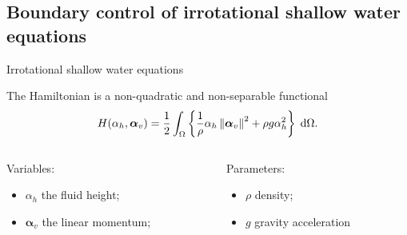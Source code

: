 \documentclass[aspectratio=169]{ISAE-Beamer}
\newcommand*{\norm}[1]{\ensuremath{\left\|#1\right\|}}
\newcommand{\energy}[1]{\frac{1}{2} \int_{\Omega} \left\{ #1 \right\} \d\Omega}
\begin{document}
\subsection{Boundary control of irrotational shallow water equations}

\begin{frame}{Irrotational shallow water equations}
	
The Hamiltonian is a non-quadratic and non-separable functional
\begin{equation*}
		H(\alpha_h, \bm{\alpha}_v) = \energy{\frac{1}{\rho} \alpha_h \norm{\bm{\alpha}_v}^2 + \rho g \alpha_h^2}.
\end{equation*}


\begin{columns}
	
	\begin{column}{.45\textwidth}
		Variables: 
		\begin{itemize}
			\item $\alpha_h$ the fluid height;
			\item $\bm{\alpha}_v$ the linear momentum;
		\end{itemize}
	\end{column}
	
	\begin{column}{.45\textwidth}
		Parameters:
		\begin{itemize}
			\item $\rho$ density;
			\item $g$ gravity acceleration
		\end{itemize}
	\end{column}
	
\end{columns}

\vspace{.5cm}
	

\end{frame}
\end{document}
